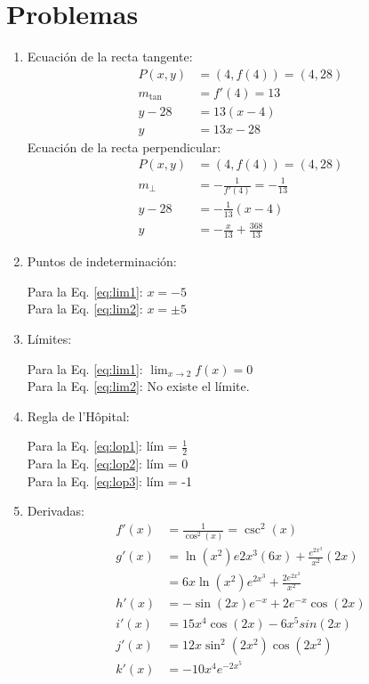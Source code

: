 \documentclass{article}
\begin{document}
\section{Problemas} %
\label{sec:resproblemas}
\begin{enumerate}

\item Ecuación de la recta tangente:
\begin{align*}
P(x,y) &= (4,f(4)) = (4,28) \\
m_{\tan} &= f'(4) = 13 \\
y - 28 &= 13(x-4) \\
y &= 13x -28
\end{align*}
Ecuación de la recta perpendicular:
\begin{align*}
P(x,y) &= (4,f(4)) = (4,28) \\
m_{\perp} &=- \frac{1}{f'(4)} =-\frac{1}{13} \\
y - 28 &= -\frac{1}{13}(x-4) \\
y &= - \frac{x}{13} + \frac{368}{13}
\end{align*}

\item Puntos de indeterminación: 

Para la Eq. \eqref{eq:lim1}: $x=-5$ \\
Para la Eq. \eqref{eq:lim2}: $x = \pm 5$

\item Límites: 

Para la Eq. \eqref{eq:lim1}: $\lim_{x \rightarrow 2}f(x) = 0$ \\
Para la Eq. \eqref{eq:lim2}: No existe el límite.

\item Regla de l'H\^opital:

Para la Eq. \eqref{eq:lop1}: lím = $\frac{1}{2}$  \\
Para la Eq. \eqref{eq:lop2}: lím = 0  \\
Para la Eq. \eqref{eq:lop3}: lím = -1 

\item Derivadas:
\begin{align*}
f'(x) &= \frac{1}{\cos^2(x)} = \csc^{2}(x) \\
g'(x) &= \ln(x^{2})e{2x^{3}}(6x) + \frac{e^{2x^{3}}}{x^2}(2x) \\
      &= 6x \ln(x^{2})e^{2x^{3}} + \frac{2e^{2x^3}}{x^2} \\
h'(x) &= - \sin(2x)e^{-x} + 2e^{-x} \cos{(2x)} \\
i'(x) &= 15x^{4} \cos(2x) -6x^{5}sin(2x) \\
j'(x) &= 12x \sin^{2}(2x^{2}) \cos(2x^{2}) \\
k'(x) &= -10x^{4}e^{-2x^{5}}
\end{align*}


\end{enumerate}
\end{document}
